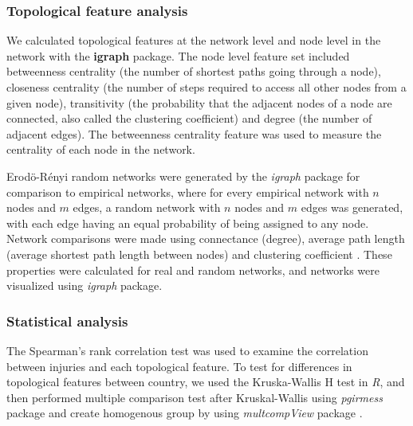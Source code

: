 \subsubsection{Topological feature analysis}

We calculated topological features at the network level and node level in the network with the \textbf{igraph} package. The node level feature set included betweenness centrality (the number of shortest paths going through a node), closeness centrality (the number of steps required to access all other nodes from a given node), transitivity (the probability that the adjacent nodes of a node are connected, also called the clustering coefficient) and degree (the number of adjacent edges). The betweenness centrality feature was used to measure the centrality of each node in the network.

Erod\"{o}-R\'{e}nyi random networks were generated by the \textit{igraph} package for comparison to empirical networks, where for every empirical network with $n$ nodes and $m$ edges, a random network with $n$ nodes and $m$ edges was generated, with each edge having an equal probability of being assigned to any node. Network comparisons were made using connectance (degree),  average path length (average shortest path length between nodes) and clustering coefficient \citep{Kolaczyk_2014_Statistical}. These properties were calculated for real and random networks, and networks were visualized using \textit{igraph} package. 
 
\subsubsection{Statistical analysis}
The Spearman’s rank correlation test was used to examine the correlation between injuries and each topological feature.  To test for differences in topological features between country, we used the Kruska-Wallis H test in \textit{R}, and then performed multiple comparison test after Kruskal-Wallis using \textit{pgirmess} package \citep{Giraudoux_2012_pgirmess} and create homogenous group by using \textit{multcompView} package \citep{Spencer_2015_multcompView}.





